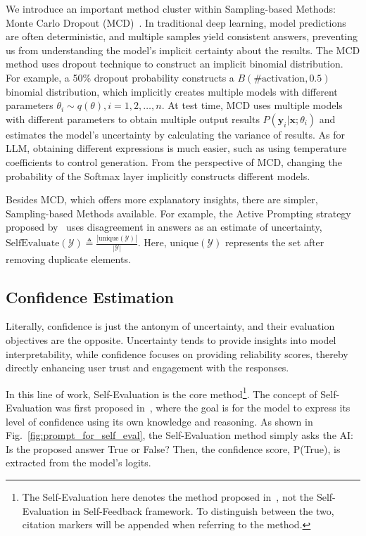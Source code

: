 \documentclass[lettersize,journal]{IEEEtran}
\begin{document}
We introduce an important method cluster within Sampling-based Methods: Monte Carlo Dropout (MCD)~\cite{pmlr-v48-gal16}. In traditional deep learning, model predictions are often deterministic, and multiple samples yield consistent answers, preventing us from understanding the model's implicit certainty about the results. The MCD method uses dropout technique to construct an implicit binomial distribution. For example, a 50\% dropout probability constructs a $ B(\text{\#activation}, 0.5)$ binomial distribution, which implicitly creates multiple models with different parameters $\theta_i \sim q(\theta), i=1,2,\ldots,n$. At test time, MCD uses multiple models with different parameters to obtain multiple output results $P(\boldsymbol{y}_i | \boldsymbol{x}; \theta_i)$ and estimates the model's uncertainty by calculating the variance of results. As for LLM, obtaining different expressions is much easier, such as using temperature coefficients to control generation. From the perspective of MCD, changing the probability of the Softmax layer implicitly constructs different models.

Besides MCD, which offers more explanatory insights, there are simpler, Sampling-based Methods available. For example, the Active Prompting strategy proposed by~\cite{ActivePrompt_23_arXiv_HUST} uses disagreement in answers as an estimate of uncertainty, $\text{SelfEvaluate}(\mathcal{Y}) \triangleq \frac{|\text{unique}(\mathcal{Y})|}{|\mathcal{Y}|}$. Here, $\text{unique}(\mathcal{Y})$ represents the set after removing duplicate elements.



\subsection{Confidence Estimation} \label{sec:confidence}

\noindent Literally, confidence is just the antonym of uncertainty, and their evaluation objectives are the opposite. Uncertainty tends to provide insights into model interpretability, while confidence focuses on providing reliability scores, thereby directly enhancing user trust and engagement with the responses.

In this line of work, Self-Evaluation is the core method\footnote{The Self-Evaluation here denotes the method proposed in~\cite{TheoryKnowKnow_22_arXiv_Anthropic}, not the Self-Evaluation in Self-Feedback framework. To distinguish between the two, citation markers will be appended when referring to the method.}. The concept of Self-Evaluation was first proposed in~\cite{TheoryKnowKnow_22_arXiv_Anthropic}, where the goal is for the model to express its level of confidence using its own knowledge and reasoning. As shown in Fig.~\ref{fig:prompt_for_self_eval}, the Self-Evaluation method simply asks the AI: Is the proposed answer True or False? Then, the confidence score, P(True), is extracted from the model's logits.
\end{document}
